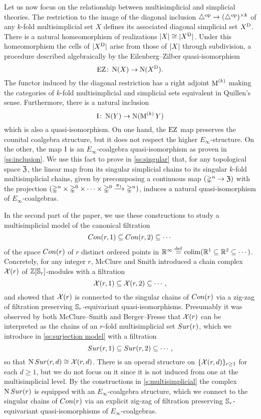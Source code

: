 Let us now focus on the relationship between multisimplicial and simplicial theories.
The restriction to the image of the diagonal inclusion $\triangle^{\mathrm{op}} \to (\triangle^{\mathrm{op}})^{\times k}$ of any $k$-fold multisimplicial set $X$ defines its associated diagonal simplicial set $X^{\mathrm{D}}$.
There is a natural homeomorphism of realizations $\lvert X\rvert \cong \lvert X^{\mathrm{D}}\rvert$.
Under this homeomorphism the cells of $\lvert X^{\mathrm{D}}\rvert$ arise from those of $\lvert X\rvert$ through subdivision, a procedure described algebraically by the Eilenberg--Zilber quasi-isomorphism
\[
\operatorname{EZ} \colon \operatorname{N}(X) \to \operatorname{N}(X^{\mathrm{D}}).
\]
The functor induced by the diagonal restriction has a right adjoint $\operatorname{M}^{(k)}$ making the categories of $k$-fold multisimplicial and simplicial sets equivalent in Quillen's sense.
Furthermore, there is a natural inclusion
\[
\operatorname{I} \colon \operatorname{N}(Y) \to \operatorname{N}(\operatorname{M}^{(k)} Y)
\]
which is also a quasi-isomorphism.
On one hand, the $\operatorname{EZ}$ map preserves the counital coalgebra structure, but it does not respect the higher $E_\infty$-structure.
On the other, the map $\operatorname{I}$ is an $E_\infty$-coalgebra quasi-isomorphism as proven in \cref{ss:inclusion}.
We use this fact to prove in \cref{ss:singular} that, for any topological space $\mathfrak{Z}$, the linear map from its singular simplicial chains to its singular $k$-fold multisimplicial chains, given by precomposing a continuous map $(\mathbb{\Delta}^n \to \mathfrak{Z})$ with the projection $(\mathbb{\Delta}^n \times \mathbb{\Delta}^{0}\times\dots\times\mathbb{\Delta}^{0} \xrightarrow{\pi_1} \mathbb{\Delta}^n)$, induces a natural quasi-isomorphism of $E_\infty$-coalgebras.

In the second part of the paper, we use these constructions to study a multisimplicial model of the canonical filtration
\[
Con(r,1) \subseteq Con(r,2) \subseteq \dotsb
\]
of the space $Con(r)$ of $r$ distinct ordered points in $\mathbb{R}^\infty \stackrel{\mathrm{def}}{=} \operatorname*{colim} (\mathbb{R}^1 \subseteq \mathbb{R}^2 \subseteq \dotsb)$.
Concretely, for any integer $r$, McClure and Smith \cite{mcclure2003multivariable} introduced a chain complex $\mathcal{X}(r)$ of $\mathbb{Z}[\mathbb{S}_r]$-modules with a filtration
\[
\mathcal{X}(r,1) \subseteq \mathcal{X}(r,2) \subseteq \dotsb \,,
\]
and showed that $\mathcal{X}(r)$ is connected to the singular chains of $Con(r)$ via a zig-zag of filtration preserving $\mathbb{S}_r$-equivariant quasi-isomorphisms.
Presumably it was observed by both McClure--Smith and Berger--Fresse that $\mathcal{X}(r)$ can be interpreted as the chains of an $r$-fold multisimplicial set $Sur(r)$, which we introduce in \cref{ss:surjection model} with a filtration
\[
Sur(r,1) \subseteq Sur(r,2) \subseteq \dotsb \,,
\]
so that $\operatorname{N}Sur(r,d) \cong \mathcal{X}(r,d)$.
There is an operad structure on $\{\mathcal{X}(r,d)\}_{r \geq 1}$ for each $d \geq 1$, but we do not focus on it since it is not induced from one at the multisimplicial level.
By the constructions in \cref{s:multisimplicial} the complex $\operatorname{N}Sur(r)$ is equipped with an $E_\infty$-coalgebra structure, which we connect to the singular chains of $Con(r)$ via an explicit zig-zag of filtration preserving $\mathbb{S}_r$-equivariant quasi-isomorphisms of $E_\infty$-coalgebras.

